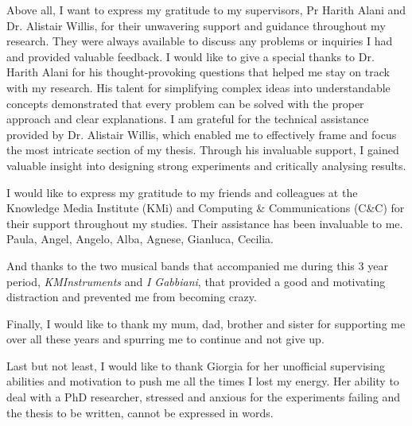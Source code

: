 Above all, I want to express my gratitude to my supervisors, Pr Harith Alani and Dr. Alistair Willis, for their unwavering support and guidance throughout my research. They were always available to discuss any problems or inquiries I had and provided valuable feedback.
I would like to give a special thanks to Dr. Harith Alani for his thought-provoking questions that helped me stay on track with my research. His talent for simplifying complex ideas into understandable concepts demonstrated that every problem can be solved with the proper approach and clear explanations.
I am grateful for the technical assistance provided by Dr. Alistair Willis, which enabled me to effectively frame and focus the most intricate section of my thesis. Through his invaluable support, I gained valuable insight into designing strong experiments and critically analysing results.


I would like to express my gratitude to my friends and colleagues at the Knowledge Media Institute (KMi) and Computing \& Communications (C\&C) for their support throughout my studies. Their assistance has been invaluable to me. Paula, Angel, Angelo, Alba, Agnese, Gianluca, Cecilia.

And thanks to the two musical bands that accompanied me during this 3 year period, \emph{KMInstruments} and \emph{I Gabbiani}, that provided a good and motivating distraction and prevented me from becoming crazy. 

Finally, I would like to thank my mum, dad, brother and sister for supporting me over all these years and spurring me to continue and not give up.

Last but not least, I would like to thank Giorgia for her unofficial supervising abilities and motivation to push me all the times I lost my energy. Her ability to deal with a PhD researcher, stressed and anxious for the experiments failing and the thesis to be written, cannot be expressed in words.
